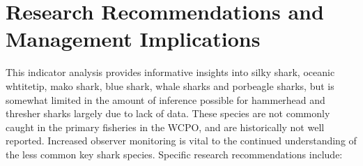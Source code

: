 \documentclass[12pt]{SCreport}
\begin{document}


\section{  Research Recommendations and Management Implications}

This indicator analysis provides informative insights into silky shark, oceanic whtitetip, mako shark, blue shark, whale sharks and porbeagle sharks, but is somewhat limited in the amount of inference possible for hammerhead and thresher sharks largely due to lack of data. These species are not commonly caught in the primary fisheries in the WCPO, and are historically not well reported. Increased observer monitoring is vital to the continued understanding of the less common key shark species. Specific research recommendations include: 
 
\end{document}
